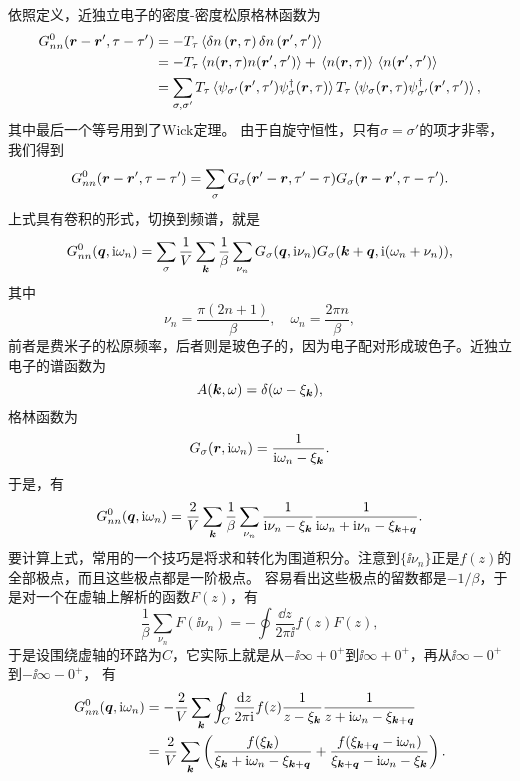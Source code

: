 依照定义，近独立电子的密度-密度松原格林函数为
\[
    \begin{aligned}
        G_{nn}^\text{0}(\vb*{r}-\vb*{r}', \tau-\tau') &= - T_\tau \expval*{\var{{n}}(\vb*{r}, \tau) \var{{n}}(\vb*{r}', \tau')} \\
        &= - T_\tau \expval*{{{n}}(\vb*{r}, \tau) {{n}}(\vb*{r}', \tau')} + \expval*{{n}(\vb*{r}, \tau)} \expval*{{n}(\vb*{r}', \tau')} \\
        &= \sum_{\sigma, \sigma'} T_\tau \expval*{{\psi}_{\sigma'}(\vb*{r}', \tau') {\psi}^\dagger_\sigma(\vb*{r}, \tau)} T_\tau \expval*{ {\psi}_\sigma(\vb*{r}, \tau) {\psi}^\dagger_{\sigma'}(\vb*{r}', \tau') } ,
    \end{aligned}
\]
其中最后一个等号用到了Wick定理。
由于自旋守恒性，只有$\sigma = \sigma'$的项才非零，我们得到
\begin{equation}
    G_{nn}^\text{0}(\vb*{r}-\vb*{r}', \tau-\tau') = \sum_\sigma G_\sigma(\vb*{r}' - \vb*{r}, \tau' - \tau) G_\sigma(\vb*{r} - \vb*{r}', \tau - \tau').
    \label{eq:relation-density-density-green-function-free-electron}
\end{equation}
上式具有卷积的形式，切换到频谱，就是
\[
    G_{nn}^\text{0}(\vb*{q}, \mathrm{i} \omega_n) = \sum_{\sigma} \frac{1}{V} \sum_{\vb*{k}} \frac{1}{\beta} \sum_{\nu_n} G_\sigma(\vb*{q}, \mathrm{i} \nu_n) G_\sigma(\vb*{k} + \vb*{q}, \mathrm{i} (\omega_n + \nu_n)),
\]
其中
\[
    \nu_n = \frac{\pi(2n+1)}{\beta}, \quad \omega_n = \frac{2\pi n}{\beta},
\]
前者是费米子的松原频率，后者则是玻色子的，因为电子配对形成玻色子。近独立电子的谱函数为
\[
    A(\vb*{k}, \omega) = \delta(\omega - \xi_{\vb*{k}}), 
\]
格林函数为
\[
    G_\sigma(\vb*{r}, \mathrm{i} \omega_n) = \frac{1}{\mathrm{i} \omega_n - \xi_{\vb*{k}}}.
\]
于是，有
\[
    G_{nn}^\text{0}(\vb*{q}, \mathrm{i} \omega_n) = \frac{2}{V} \sum_{\vb*{k}} \frac{1}{\beta} \sum_{\nu_n} \frac{1}{\mathrm{i} \nu_n - \xi_{\vb*{k}}} \frac{1}{\mathrm{i} \omega_n + \mathrm{i} \nu_n - \xi_{\vb*{k}+\vb*{q}}}.
\]
要计算上式，常用的一个技巧是将求和转化为围道积分。注意到$\{\ii \nu_n\}$正是$f(z)$的全部极点，而且这些极点都是一阶极点。
容易看出这些极点的留数都是$-1/\beta$，于是对一个在虚轴上解析的函数$F(z)$，有
\[
    \frac{1}{\beta} \sum_{\nu_n} F(\ii \nu_n) = - \oint \frac{\dd{z}}{2\pi \ii} f(z) F(z),
\]
于是设围绕虚轴的环路为$C$，它实际上就是从$-\ii \infty + 0^+$到$\ii \infty + 0^+$，再从$\ii \infty - 0^+$到$-\ii \infty - 0^+$，
有
\begin{equation}
    \begin{aligned}
        G_{nn}^\text{0}(\vb*{q}, \mathrm{i} \omega_n) &= - \frac{2}{V} \sum_{\vb*{k}} \oint_C \frac{\dd{z}}{2\pi \mathrm{i}} f(z) \frac{1}{z - \xi_{\vb*{k}}} \frac{1}{z +  \mathrm{i} \omega_n - \xi_{\vb*{k}+\vb*{q}}} \\
        &= \frac{2}{V} \sum_{\vb*{k}} \left( \frac{f(\xi_{\vb*{k}})}{\xi_{\vb*{k}} + \mathrm{i} \omega_n - \xi_{\vb*{k} + \vb*{q}}} + \frac{f(\xi_{\vb*{k} + \vb*{q}} - \mathrm{i} \omega_n)}{\xi_{\vb*{k} + \vb*{q}} - \mathrm{i} \omega_n - \xi_{\vb*{k}}} \right).
    \end{aligned}
    \label{eq:analytical-compute-green-nn-ret}
\end{equation}
